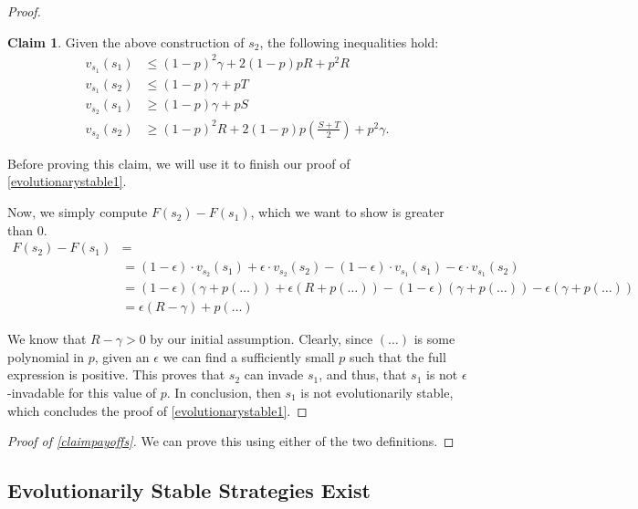 \documentclass[11pt]{amsart}
\theoremstyle{definition}
\newtheorem{claim}[theorem]{Claim}
\theoremstyle{remark}
\begin{document}
\begin{proof}
      \begin{claim}
        Given the above construction of $s_2$, the following inequalities hold:
      \begin{align*}
        v_{s_1}(s_1) &\leq (1-p)^2 \gamma + 2(1-p)p R + p^2  R \\ 
        v_{s_1}(s_2) &\leq (1-p) \gamma + p T \\
        v_{s_2}(s_1) &\geq (1 - p) \gamma  + p S \\
        v_{s_2}(s_2) &\geq (1-p)^{2} R + 2 (1-p) p (\tfrac{S + T}{2}) + p^2 \gamma .
      \end{align*}
      \end{claim}

      Before proving this claim, we will use it to finish our proof of \cref{evolutionarystable1}.

      Now, we simply compute $F(s_2) - F(s_1)$, which we want to show is greater than 0.
      \begin{align*}
        F(s_2) - F(s_1) &= \\
        &= (1 - \epsilon) \cdot v_{s_2}(s_1) + \epsilon \cdot v_{s_2}(s_2) - (1 - \epsilon) \cdot v_{s_1}(s_1) - \epsilon \cdot v_{s_1}(s_2) \\
        &= (1 - \epsilon) (\gamma + p(\ldots)) + \epsilon (R + p(\ldots)) - (1-\epsilon) (\gamma + p(\ldots)) - \epsilon (\gamma + p(\ldots)) \\
        &= \epsilon (R - \gamma) + p(\ldots)
      \end{align*}

      We know that $R - \gamma > 0$ by our initial assumption. Clearly, since $(\ldots)$ is some polynomial in $p$, given an $\epsilon$ we can find a sufficiently small $p$ such that the full expression is positive. This proves that $s_2$ can invade $s_1$, and thus, that $s_1$ is not $\epsilon$-invadable for this value of $p$. In conclusion, then $s_1$ is not evolutionarily stable, which concludes the proof of \cref{evolutionarystable1}.

    \end{proof}

    \begin{proof}[Proof of \cref{claimpayoffs}]
      We can prove this using either of the two definitions.
    \end{proof}

    \subsection{Evolutionarily Stable Strategies Exist}
\end{document}
